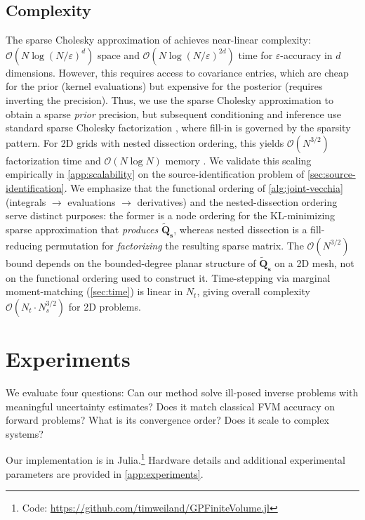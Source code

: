 \documentclass{article}
\theoremstyle{plain}
\theoremstyle{definition}
\theoremstyle{remark}
\begin{document}
\subsection{Complexity}
\label{sec:complexity}

The sparse Cholesky approximation of \citet{schaferSparseCholeskyFactorization2021a} achieves near-linear complexity: $\mathcal{O}(N \log(N/\varepsilon)^d)$ space and $\mathcal{O}(N \log(N/\varepsilon)^{2d})$ time for $\varepsilon$-accuracy in $d$ dimensions.
However, this requires access to covariance entries, which are cheap for the prior (kernel evaluations) but expensive for the posterior (requires inverting the precision).
Thus, we use the sparse Cholesky approximation to obtain a sparse \emph{prior} precision, but subsequent conditioning and inference use standard sparse Cholesky factorization \citep{chenAlgorithm887CHOLMOD2008}, where fill-in is governed by the sparsity pattern.
For 2D grids with nested dissection ordering, this yields $\mathcal{O}(N^{3/2})$ factorization time and $\mathcal{O}(N \log N)$ memory \citep{liptonNestedDissection1979}.
We validate this scaling empirically in \cref{app:scalability} on the source-identification problem of \cref{sec:source-identification}.
We emphasize that the functional ordering of \cref{alg:joint-vecchia} (integrals $\rightarrow$ evaluations $\rightarrow$ derivatives) and the nested-dissection ordering serve distinct purposes: the former is a node ordering for the KL-minimizing sparse approximation that \emph{produces} $\bm{\tilde{Q}_s}$, whereas nested dissection is a fill-reducing permutation for \emph{factorizing} the resulting sparse matrix.
The $\mathcal{O}(N^{3/2})$ bound depends on the bounded-degree planar structure of $\bm{\tilde{Q}_s}$ on a 2D mesh, not on the functional ordering used to construct it.
Time-stepping via marginal moment-matching (\cref{sec:time}) is linear in $N_t$, giving overall complexity $\mathcal{O}(N_t \cdot N_s^{3/2})$ for 2D problems.

\section{Experiments}
\label{sec:experiments}

We evaluate four questions: Can our method solve ill-posed inverse problems with meaningful uncertainty estimates? Does it match classical FVM accuracy on forward problems? What is its convergence order? Does it scale to complex systems?

Our implementation is in Julia.\footnote{Code: \url{https://github.com/timweiland/GPFiniteVolume.jl}}
Hardware details and additional experimental parameters are provided in \cref{app:experiments}.
\end{document}
